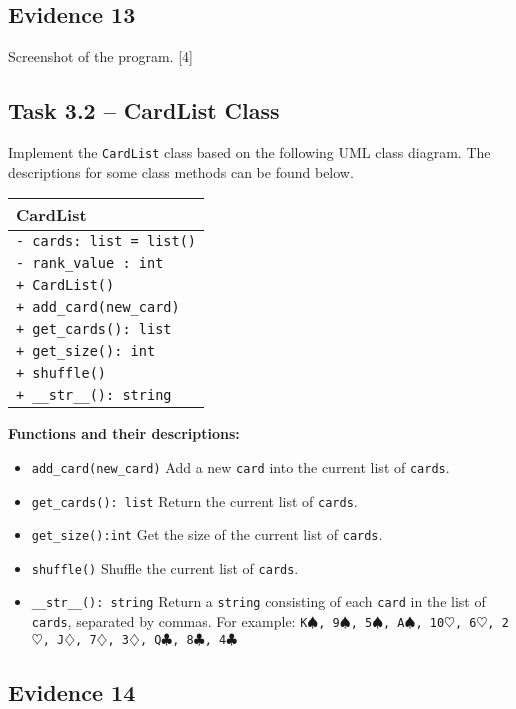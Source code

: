 \subsection*{Evidence 13 }

Screenshot of the program. \hfill{}{[}4{]}

\subsection*{Task 3.2 -- CardList Class }

Implement the \texttt{CardList} class based on the following UML class
diagram. The descriptions for some class methods can be found below.
\begin{center}
\begin{tabular}{|l|}
\hline 
\hspace{0.25\columnwidth}CardList\tabularnewline
\hline 
\texttt{- cards: list = list()}\tabularnewline
\texttt{- rank\_value : int}\tabularnewline
\hline 
\texttt{+ CardList()}\tabularnewline
\texttt{+ add\_card(new\_card)}\tabularnewline
\texttt{+ get\_cards(): list}\tabularnewline
\texttt{+ get\_size(): int}\tabularnewline
\texttt{+ shuffle()}\tabularnewline
\texttt{+ \_\_str\_\_(): string}\tabularnewline
\hline 
\end{tabular}
\par\end{center}

\textbf{Functions and their descriptions:}
\begin{itemize}
\item \texttt{add\_card(new\_card)} Add a new \texttt{card} into the current
list of \texttt{cards}. 
\item \texttt{get\_cards(): list} Return the current list of \texttt{cards}. 
\item \texttt{get\_size():int} Get the size of the current list of \texttt{cards}. 
\item \texttt{shuffle()} Shuffle the current list of \texttt{cards}. 
\item \texttt{\_\_str\_\_(): string} Return a \texttt{string} consisting
of each \texttt{card} in the list of \texttt{cards}, separated by
commas. For example: \textquotedbl{} \texttt{K$\spadesuit$, 9$\spadesuit$,
5$\spadesuit$, A$\spadesuit$, 10$\heartsuit$, 6$\heartsuit$, 2$\heartsuit$,
J$\diamondsuit$, 7$\diamondsuit$, 3$\diamondsuit$, Q$\clubsuit$,
8$\clubsuit$, 4$\clubsuit$}\textquotedbl{} 
\end{itemize}

\subsection*{Evidence 14}

